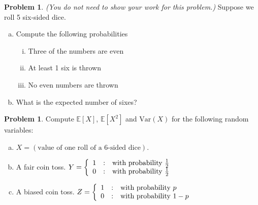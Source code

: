 \documentclass[10pt]{article}
\theoremstyle{definition}
\newtheorem{problem}[theorem]{Problem}
\newcommand{\1}[1]{\textbf{1}_{\left[#1\right]}} %
\def\E{\mathbb{E}} %
\def\Var{\mathrm{Var}} %
\begin{document}
\begin{problem}
  \textit{(You do not need to show your work for this problem.)} Suppose we roll  5 six-sided dice.
  \begin{enumerate}[(a)]
    \item  Compute the following probabilities
    \begin{enumerate}[(i)]
      \item Three of the numbers are even
      \item At least 1 six is thrown
      \item No even numbers are thrown
    \end{enumerate}
    \item What is the expected number of sixes?
  \end{enumerate}
\end{problem}



\begin{problem}
  Compute $\E\left[X \right]$, $\E\left[X^{2} \right]$ and $\Var(X)$ for the
  following random variables:
  \begin{enumerate}[(a)]
    \item $X = (\text{value of one roll of a 6-sided dice})$.
    \item A fair coin toss.
    $Y = \left\{ \begin{array}{l@{\quad:\quad}l} 1 & \text{with probability
        }\frac{1}{2}\\0 & \text{with probability
        }\frac{1}{2} \end{array}\right.$
    \item A biased coin toss. $Z = \left\{ \begin{array}{l@{\quad:\quad}l} 1 &  \text{with
          probability }p\\0 & \text{with probability }1-p \end{array}\right.$
  \end{enumerate}
\end{problem}
\end{document}

